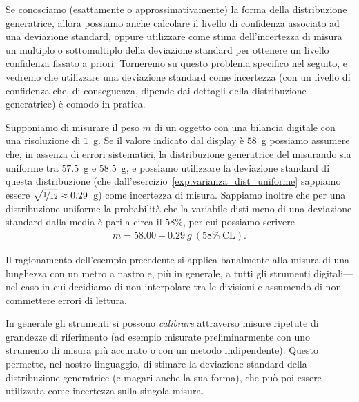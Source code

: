 Se conosciamo (esattamente o approssimativamente) la forma della
distribuzione generatrice, allora possiamo anche calcolare il livello di
confidenza associato ad una deviazione standard, oppure utilizzare come stima
dell'incertezza di misura un multiplo o sottomultiplo della deviazione standard
per ottenere un livello confidenza fissato a priori. Torneremo su questo
problema specifico nel seguito, e vedremo che utilizzare una deviazione
standard come incertezza (con un livello di confidenza che, di conseguenza,
dipende dai dettagli della distribuzione generatrice) è comodo in pratica.

\begin{examplebox}
  \begin{example}
    Supponiamo di misurare il peso $m$ di un oggetto con una bilancia digitale
    con una risoluzione di $1$~g. Se il valore indicato dal display è $58$~g
    possiamo assumere che, in assenza di errori sistematici, la distribuzione
    generatrice del misurando sia uniforme tra $57.5$~g e $58.5$~g, e possiamo
    utilizzare la deviazione standard di questa distribuzione (che
    dall'esercizio~\ref{exp:varianza_dist_uniforme} sappiamo essere
    $\sqrt{\nicefrac{1}{12}} \approx 0.29$~g) come incertezza di misura.
    Sappiamo inoltre che per una distribuzione uniforme la probabilità che
    la variabile disti meno di una deviazione standard dalla media è pari
    a circa il $58\%$, per cui possiamo scrivere
    \begin{align*}
      m = 58.00 \pm 0.29~g~(58\%~\text{CL}).
    \end{align*}
  \end{example}

  \begin{example}
    Il ragionamento dell'esempio precedente si applica banalmente alla misura di
    una lunghezza con un metro a nastro e, più in generale, a tutti gli
    strumenti digitali---nel caso in cui decidiamo di non interpolare tra le
    divisioni e assumendo di non commettere errori di lettura.
  \end{example}

  \begin{example}
    In generale gli strumenti si possono \emph{calibrare} attraverso misure
    ripetute di grandezze di riferimento (ad esempio misurate preliminarmente
    con uno strumento di misura più accurato o con un metodo indipendente).
    Questo permette, nel nostro linguaggio, di stimare la deviazione standard
    della distribuzione generatrice (e magari anche la sua forma), che può poi
    essere utilizzata come incertezza sulla singola misura.
  \end{example}
\end{examplebox}

